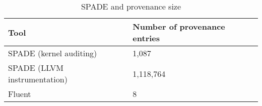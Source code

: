 \begin{table}[t]
  \centering
  \caption{SPADE and \fluent{} provenance size}
  \begin{tabular}{ll}
    \toprule
    Tool                         & Number of provenance entries \\\midrule
    SPADE (kernel auditing)      & 1,087 \\
    SPADE (LLVM instrumentation) & 1,118,764 \\
    Fluent                       & 8 \\
    \bottomrule
  \end{tabular}
\end{table}
